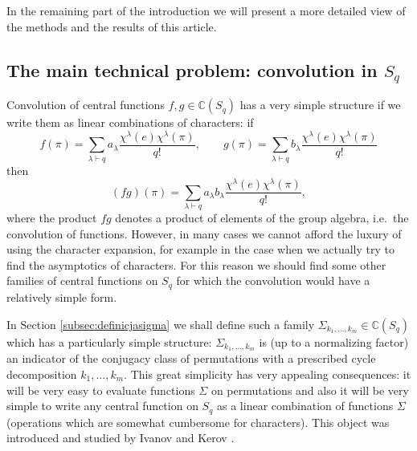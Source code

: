 \documentclass[12pt,dvips]{amsart}
\numberwithin{equation}{section} \numberwithin{figure}{section}
\theoremstyle{plain}
\theoremstyle{definition}
\theoremstyle{remark}
\newcommand{\C}{{\mathbb{C}}}
\newcommand{\Sn}[1]{{{S}}_{#1}}
\begin{document}
In the remaining part of the introduction we will present a more
detailed view of the methods and the results of this article.








\subsection{The main technical problem: convolution in $\Sn{q}$}
\label{subsec:convolutioninSq}

Convolution of central functions $f,g\in\C(\Sn{q})$ has a very
simple structure if we write them as linear combinations of
characters: if
$$f(\pi)=\sum_{\lambda\vdash q}
a_\lambda \frac{\chi^{\lambda}(e) \chi^\lambda(\pi)}{q!}, \qquad
g(\pi)=\sum_{\lambda\vdash q} b_\lambda \frac{\chi^{\lambda}(e)
\chi^\lambda(\pi)}{q!}$$ then
$$(f g)(\pi)=
\sum_{\lambda\vdash q} a_\lambda b_\lambda \frac{\chi^{\lambda}(e)
\chi^\lambda(\pi)}{ q!},$$ where the product $f g$ denotes a product
of elements of the group algebra, i.e.~the convolution of functions.
However, in many cases we cannot afford the luxury of using the
character expansion, for example in the case when we actually try to
find the asymptotics of characters. For this reason we should find
some other families of central functions on $\Sn{q}$ for which the
convolution would have a relatively simple form.

In Section \ref{subsec:definicjasigma} we shall define such a family
$\Sigma_{k_1,\dots,k_m}\in\C(\Sn{q})$ which has a particularly
simple structure: $\Sigma_{k_1,\dots,k_m}$ is (up to a normalizing
factor) an indicator of the conjugacy class of permutations with a
prescribed cycle decomposition $k_1,\dots,k_m$. This great
simplicity has very appealing consequences: it will be very easy to
evaluate functions $\Sigma$ on permutations and also it will be very
simple to write any central function on $\Sn{q}$ as a linear
combination of functions $\Sigma$ (operations which are somewhat
cumbersome for characters). This object was introduced and studied
by Ivanov and Kerov \cite{IvanovKerov1999}.
\end{document}
